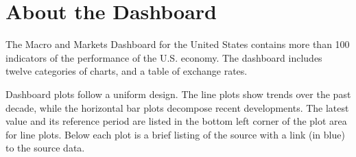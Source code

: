 \documentclass[final,a4paper]{report}
\begin{document}
	
	\begin{minipage}{0.50\textwidth} 	\vspace{4mm}
	
		\small
		\section{\textcolor{blackdark}{About the Dashboard}}
		\vspace{-1mm}
		
		\small \normalfont
		The Macro and Markets Dashboard for the United States contains more than 100 indicators of the performance of the U.S. economy. The dashboard includes twelve categories of charts, and a table of exchange rates.  \hfill \vspace{4mm}
		
		Dashboard plots follow a uniform design. The line plots show trends over the past decade, while the horizontal bar plots decompose recent developments. The latest value and its reference period are listed in the bottom left corner of the plot area for line plots. Below each plot is a brief listing of the source with a link (in blue) to the source data. 

	\end{minipage}
\end{document}
